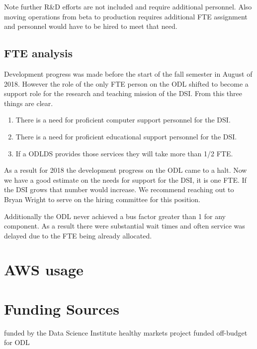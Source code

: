 Note further R\&D efforts are not included and require additional personnel. Also moving operations from beta to production requires additional FTE assignment and personnel would have to be hired to meet that need.

\subsection{FTE analysis}
Development progress was made before the start of the fall semester in August of 2018. However the role of the only FTE person on the ODL shifted to become a support role for the research and teaching mission of the DSI. From this three things are clear. 
\begin{enumerate}
\item There is a need for proficient computer support personnel for the DSI.
\item There is a need for proficient educational support personnel for the DSI.
\item If a ODLDS provides those services they will take more than 1/2 FTE.
\end{enumerate}
As a result for 2018 the development progress on the ODL came to a halt. Now we have a good estimate on the needs for support for the DSI, it is one FTE. If the DSI grows that number would increase. We recommend reaching out to Bryan Wright to serve on the hiring committee for this position.

Additionally the ODL never achieved a bus factor greater than 1 for any component. As a result there were substantial wait times and often service was delayed due to the FTE being already allocated.

\section{AWS usage}
\section{Funding Sources}
funded by the Data Science Institute
healthy markets project funded off-budget for ODL






